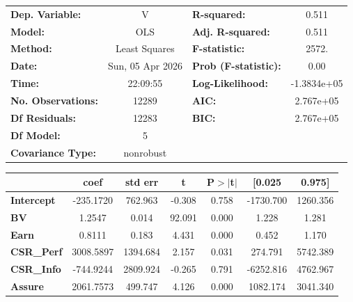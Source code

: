 \begin{center}
\begin{tabular}{lclc}
\toprule
\textbf{Dep. Variable:}    &        V         & \textbf{  R-squared:         } &       0.511     \\
\textbf{Model:}            &       OLS        & \textbf{  Adj. R-squared:    } &       0.511     \\
\textbf{Method:}           &  Least Squares   & \textbf{  F-statistic:       } &       2572.     \\
\textbf{Date:}             & Sun, 05 Apr 2026 & \textbf{  Prob (F-statistic):} &       0.00      \\
\textbf{Time:}             &     22:09:55     & \textbf{  Log-Likelihood:    } &  -1.3834e+05    \\
\textbf{No. Observations:} &       12289      & \textbf{  AIC:               } &   2.767e+05     \\
\textbf{Df Residuals:}     &       12283      & \textbf{  BIC:               } &   2.767e+05     \\
\textbf{Df Model:}         &           5      & \textbf{                     } &                 \\
\textbf{Covariance Type:}  &    nonrobust     & \textbf{                     } &                 \\
\bottomrule
\end{tabular}
\begin{tabular}{lcccccc}
                   & \textbf{coef} & \textbf{std err} & \textbf{t} & \textbf{P$> |$t$|$} & \textbf{[0.025} & \textbf{0.975]}  \\
\midrule
\textbf{Intercept} &    -235.1720  &      762.963     &    -0.308  &         0.758        &    -1730.700    &     1260.356     \\
\textbf{BV}        &       1.2547  &        0.014     &    92.091  &         0.000        &        1.228    &        1.281     \\
\textbf{Earn}      &       0.8111  &        0.183     &     4.431  &         0.000        &        0.452    &        1.170     \\
\textbf{CSR\_Perf} &    3008.5897  &     1394.684     &     2.157  &         0.031        &      274.791    &     5742.389     \\
\textbf{CSR\_Info} &    -744.9244  &     2809.924     &    -0.265  &         0.791        &    -6252.816    &     4762.967     \\
\textbf{Assure}    &    2061.7573  &      499.747     &     4.126  &         0.000        &     1082.174    &     3041.340     \\

\end{tabular}
\end{center}
